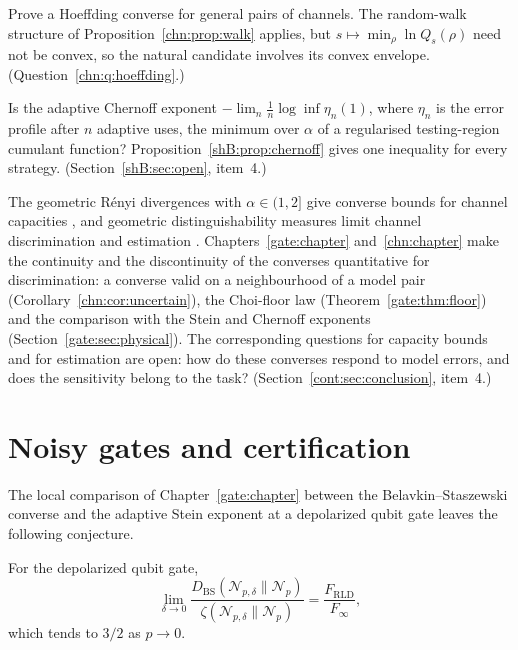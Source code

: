 \begin{problem}\label{op:prob:hoeffding}
Prove a Hoeffding converse for general pairs of channels. The random-walk structure of Proposition~\ref{chn:prop:walk} applies, but $s\mapsto\min_\rho\ln Q_s(\rho)$ need not be convex, so the natural candidate involves its convex envelope. (Question~\ref{chn:q:hoeffding}.)
\end{problem}

\begin{problem}\label{op:prob:chernoff testing}
Is the adaptive Chernoff exponent $-\lim_n\frac1n\log\inf\eta_n(1)$, where $\eta_n$ is the error profile after $n$ adaptive uses, the minimum over $\alpha$ of a regularised testing-region cumulant function? Proposition~\ref{shB:prop:chernoff} gives one inequality for every strategy. (Section~\ref{shB:sec:open}, item~4.)
\end{problem}

\begin{problem}\label{op:prob:operational}
The geometric R\'enyi divergences with $\alpha\in(1,2]$ give converse bounds for channel capacities \cite{FangFawzi2021}, and geometric distinguishability measures limit channel discrimination and estimation \cite{KatariyaWilde2021}. Chapters~\ref{gate:chapter} and~\ref{chn:chapter} make the continuity and the discontinuity of the converses quantitative for discrimination: a converse valid on a neighbourhood of a model pair (Corollary~\ref{chn:cor:uncertain}), the Choi-floor law (Theorem~\ref{gate:thm:floor}) and the comparison with the Stein and Chernoff exponents (Section~\ref{gate:sec:physical}). The corresponding questions for capacity bounds and for estimation are open: how do these converses respond to model errors, and does the sensitivity belong to the task? (Section~\ref{cont:sec:conclusion}, item~4.)
\end{problem}

\section{Noisy gates and certification}\label{op:sec:gates}

The local comparison of Chapter~\ref{gate:chapter} between the Belavkin--Staszewski converse and the adaptive Stein exponent at a depolarized qubit gate leaves the following conjecture.

\begin{conjecture}\label{op:conj:32}
For the depolarized qubit gate,
\[
\lim_{\delta\to0}\frac{D_{\mathrm{BS}}(\mathcal N_{p,\delta}\|\mathcal N_p)}{\zeta(\mathcal N_{p,\delta}\|\mathcal N_p)}=\frac{F_{\mathrm{RLD}}}{F_\infty},
\]
which tends to $3/2$ as $p\to0$.
\end{conjecture}


